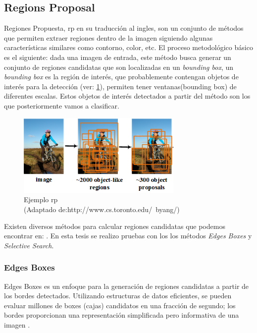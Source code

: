 \subsection{Regions Proposal} \label{sub:regions-proposal}

Regiones Propuesta, \ac{rp} en su traducción al ingles, son un conjunto de métodos que permiten extraer regiones dentro de la imagen siguiendo algunas características similares como contorno, color, etc. El proceso metodológico básico es el siguiente: dada una imagen de entrada, este método busca generar un conjunto de regiones candidatas que son localizadas en un \textit{bounding box}, un \textit{bounding box} es la región de interés, que probablemente contengan objetos de interés para la detección (ver: \ref{Fig: propsalregion}), permiten tener ventanas(bounding box) de diferentes escalas. Estos objetos de interés detectados a partir del método son los que posteriormente vamos a clasificar.

\begin{figure}[H]
 \centering
  \includegraphics[height=4cm,keepaspectratio=true,clip=true]{imagenes/Logos/regionProposal.png}
  \caption{Ejemplo \ac{rp} \\ (Adaptado de:{http://www.cs.toronto.edu/~byang/})}
	\label{Fig: propsalregion}
\end{figure}

Existen diversos métodos para calcular regiones candidatas que podemos encontrar en: \citep{proposal}. En esta tesis se realizo pruebas con los  los métodos \textit{Edges Boxes} y \textit{Selective Search}.

\subsubsection*{Edges Boxes} \label{sub:edgesboxes}

Edges Boxes es un enfoque para la generación de regiones candidatas a partir de los bordes detectados. Utilizando estructuras de datos eficientes, se pueden evaluar millones de boxes (cajas) candidatos en una fracción de segundo; los bordes proporcionan una representación simplificada pero informativa de una imagen \citep{edges}.

